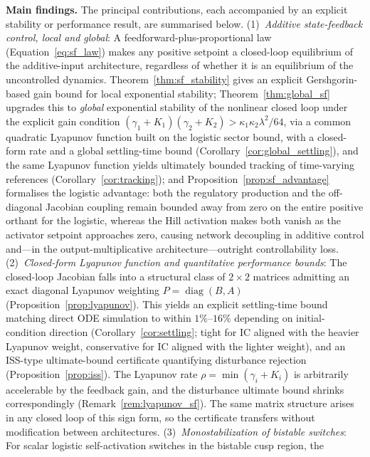 \documentclass[12pt]{article}
\begin{document}
\medskip
\noindent\textbf{Main findings.} The principal contributions, each
accompanied by an explicit stability or performance result, are
summarised below.
(1)~\emph{Additive state-feedback control, local and global}: A
feedforward-plus-proportional
law (Equation~\eqref{eq:sf_law}) makes any positive setpoint a closed-loop
equilibrium of the additive-input architecture, regardless of whether it is
an equilibrium of the uncontrolled dynamics. Theorem~\ref{thm:sf_stability}
gives an explicit Gershgorin-based gain bound for local exponential
stability; Theorem~\ref{thm:global_sf} upgrades this to \emph{global}
exponential stability of the nonlinear closed loop under the explicit
gain condition $(\gamma_1+K_1)(\gamma_2+K_2)>\kappa_1\kappa_2\lambda^2/64$,
via a common quadratic Lyapunov function built on the logistic sector
bound, with a closed-form rate and
a global settling-time bound (Corollary~\ref{cor:global_settling}), and
the same Lyapunov function yields ultimately bounded tracking of time-varying
references (Corollary~\ref{cor:tracking});
and Proposition~\ref{prop:sf_advantage} formalises the logistic advantage:
both the regulatory production and the off-diagonal Jacobian coupling
remain bounded away from zero on the entire positive orthant for the
logistic, whereas the Hill activation makes both vanish as the activator
setpoint approaches zero, causing network decoupling in additive control
and---in the output-multiplicative architecture---outright controllability loss.
(2)~\emph{Closed-form Lyapunov function and quantitative performance bounds}:
The closed-loop Jacobian falls into a structural class of $2\times 2$
matrices admitting an exact diagonal Lyapunov weighting
$P=\operatorname{diag}(B,A)$ (Proposition~\ref{prop:lyapunov}). This yields
an explicit settling-time bound matching direct ODE simulation to within
$1\%$--$16\%$ depending on initial-condition direction
(Corollary~\ref{cor:settling}; tight for IC aligned with the heavier
Lyapunov weight, conservative for IC aligned with the lighter weight),
and an ISS-type ultimate-bound certificate quantifying disturbance
rejection (Proposition~\ref{prop:iss}). The Lyapunov rate
$\rho=\min(\gamma_i+K_i)$ is arbitrarily accelerable by the feedback
gain, and the disturbance ultimate bound shrinks correspondingly
(Remark~\ref{rem:lyapunov_sf}). The same matrix structure arises in any
closed loop of this sign form, so the
certificate transfers without modification between architectures.
(3)~\emph{Monostabilization of bistable switches}: For scalar
logistic self-activation switches in the bistable cusp region, the
\end{document}
